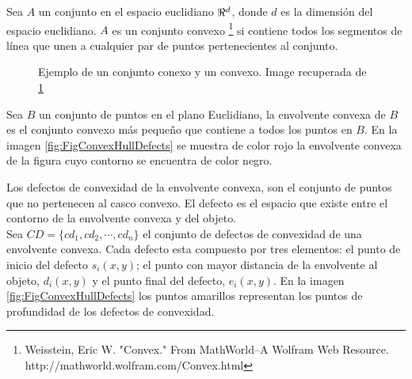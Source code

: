 Sea $A$ un conjunto en el espacio euclidiano $\bold{\Re}^d$, donde $d$ es la dimensión del espacio euclidiano. $A$ es un conjunto convexo \footnote{\label{ConvexFN} Weisstein, Eric W. "Convex." From MathWorld--A Wolfram Web Resource. http://mathworld.wolfram.com/Convex.html} si contiene todos los segmentos de línea que unen a cualquier par de puntos pertenecientes al conjunto.  
\begin{figure}[h!]
\centering
{} \hspace{10mm}
 \hspace{10mm}
\caption{Ejemplo de un conjunto conexo y un convexo. Image recuperada de \ref{ConvexFN} }\label{fig:Sets}
\end{figure} 

Sea $B$ un conjunto de puntos en el plano Euclidiano, la envolvente convexa de $B$ es el conjunto convexo más pequeño que contiene a todos los puntos en $B$. En la imagen \ref{fig:FigConvexHullDefects} se muestra de color rojo la envolvente convexa de la figura cuyo contorno se encuentra de color negro. 

Los defectos de convexidad de la envolvente convexa, son el conjunto de puntos que no pertenecen al casco convexo. El defecto es el espacio que existe entre el contorno de la envolvente convexa y del objeto.\\
Sea $CD=\lbrace cd_1, cd_2, \cdots, cd_n \rbrace$ el conjunto de defectos de convexidad de una envolvente convexa. Cada defecto esta compuesto por tres elementos: el punto de inicio del defecto $s_i(x,y)$; el punto con mayor distancia de la envolvente al objeto, $d_i(x,y)$ y el punto final del defecto, $e_i(x,y)$.
En la imagen \ref{fig:FigConvexHullDefects} los puntos amarillos representan los puntos de profundidad de los defectos de convexidad. 

